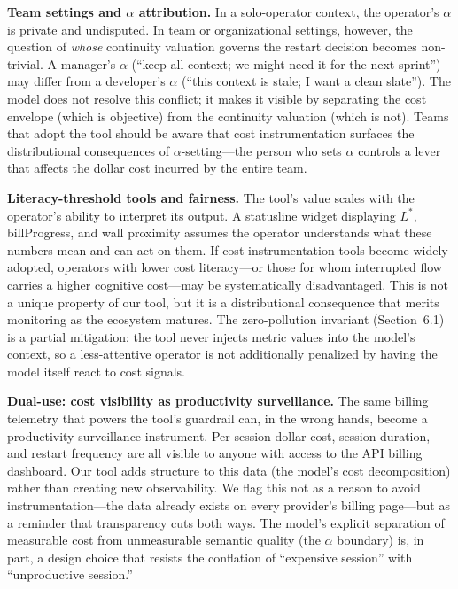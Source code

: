 \documentclass[11pt]{article}
\theoremstyle{definition}
\theoremstyle{remark}
\begin{document}
\textbf{Team settings and $\alpha$ attribution.} In a solo-operator context, the operator's $\alpha$ is private and undisputed. In team or organizational settings, however, the question of \emph{whose} continuity valuation governs the restart decision becomes non-trivial. A manager's $\alpha$ (``keep all context; we might need it for the next sprint'') may differ from a developer's $\alpha$ (``this context is stale; I want a clean slate''). The model does not resolve this conflict; it makes it visible by separating the cost envelope (which is objective) from the continuity valuation (which is not). Teams that adopt the tool should be aware that cost instrumentation surfaces the distributional consequences of $\alpha$-setting---the person who sets $\alpha$ controls a lever that affects the dollar cost incurred by the entire team.

\textbf{Literacy-threshold tools and fairness.} The tool's value scales with the operator's ability to interpret its output. A statusline widget displaying $L^*$, billProgress, and wall proximity assumes the operator understands what these numbers mean and can act on them. If cost-instrumentation tools become widely adopted, operators with lower cost literacy---or those for whom interrupted flow carries a higher cognitive cost---may be systematically disadvantaged. This is not a unique property of our tool, but it is a distributional consequence that merits monitoring as the ecosystem matures. The zero-pollution invariant (Section~6.1) is a partial mitigation: the tool never injects metric values into the model's context, so a less-attentive operator is not additionally penalized by having the model itself react to cost signals.

\textbf{Dual-use: cost visibility as productivity surveillance.} The same billing telemetry that powers the tool's guardrail can, in the wrong hands, become a productivity-surveillance instrument. Per-session dollar cost, session duration, and restart frequency are all visible to anyone with access to the API billing dashboard. Our tool adds structure to this data (the model's cost decomposition) rather than creating new observability. We flag this not as a reason to avoid instrumentation---the data already exists on every provider's billing page---but as a reminder that transparency cuts both ways. The model's explicit separation of measurable cost from unmeasurable semantic quality (the $\alpha$ boundary) is, in part, a design choice that resists the conflation of ``expensive session'' with ``unproductive session.''
\end{document}
